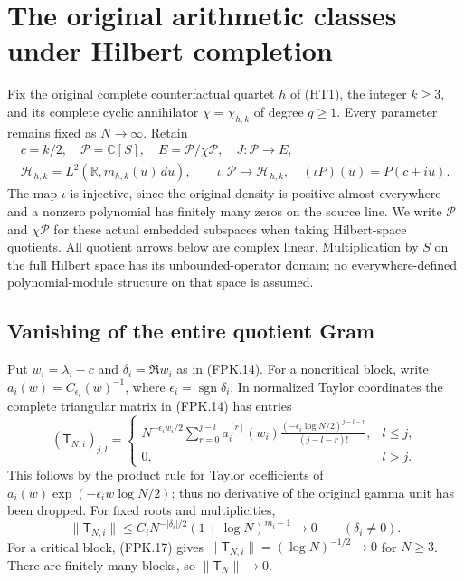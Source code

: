 \section{The original arithmetic classes under Hilbert completion}
\label{sec:fixed-packet-hilbert-geometry}

Fix the original complete counterfactual quartet $h$ of (HT1), the
integer $k\geq3$, and its complete cyclic annihilator
$\chi=\chi_{h,k}$ of degree $q\geq1$.
Every parameter remains fixed as $N\to\infty$. Retain
\[
 \begin{gathered}
 c=k/2,\quad \mathcal P=\mathbb C[S],\quad
 E=\mathcal P/\chi\mathcal P,\quad J:\mathcal P\longrightarrow E,\\
 \mathscr H_{h,k}=L^2(\mathbb R,m_{h,k}(u)\,du),\qquad
 \iota:\mathcal P\longrightarrow\mathscr H_{h,k},\quad
             (\iota P)(u)=P(c+iu).
 \end{gathered}
 \tag{FKG.1}
\]
The map $\iota$ is injective, since the original density is positive
almost everywhere and a nonzero polynomial has finitely many zeros
on the source line. We write $\mathcal P$ and $\chi\mathcal P$ for
these actual embedded subspaces when taking Hilbert-space quotients.
All quotient arrows below are complex linear. Multiplication by $S$
on the full Hilbert space has its unbounded-operator domain; no
everywhere-defined polynomial-module structure on that space is assumed.

\subsection{Vanishing of the entire quotient Gram}

Put $w_i=\lambda_i-c$ and $\delta_i=\Re w_i$ as in (FPK.14).
For a noncritical block, write $a_i(w)=C_{\epsilon_i}(w)^{-1}$,
where $\epsilon_i=\operatorname{sgn}\delta_i$. In normalized Taylor
coordinates the complete triangular matrix in (FPK.14) has entries
\[
 (\mathsf T_{N,i})_{j,l}=
 \begin{cases}
 N^{-\epsilon_iw_i/2}
 \displaystyle\sum_{r=0}^{j-l}
       a_i^{[r]}(w_i)
       \frac{(-\epsilon_i\log N/2)^{j-l-r}}{(j-l-r)!},&l\leq j,\\
 0,&l>j.
 \end{cases}
 \tag{FKG.2}
\]
This follows by the product rule for Taylor coefficients of
$a_i(w)\exp(-\epsilon_i w\log N/2)$; thus no derivative of the
original gamma unit has been dropped. For fixed roots and multiplicities,
\[
 \|\mathsf T_{N,i}\|
 \leq C_i N^{-|\delta_i|/2}(1+\log N)^{m_i-1}
       \longrightarrow0\qquad(\delta_i\ne0).
 \tag{FKG.3}
\]
For a critical block, (FPK.17) gives
$\|\mathsf T_{N,i}\|=(\log N)^{-1/2}\to0$ for $N\geq3$.
There are finitely many blocks, so $\|\mathsf T_N\|\to0$.

